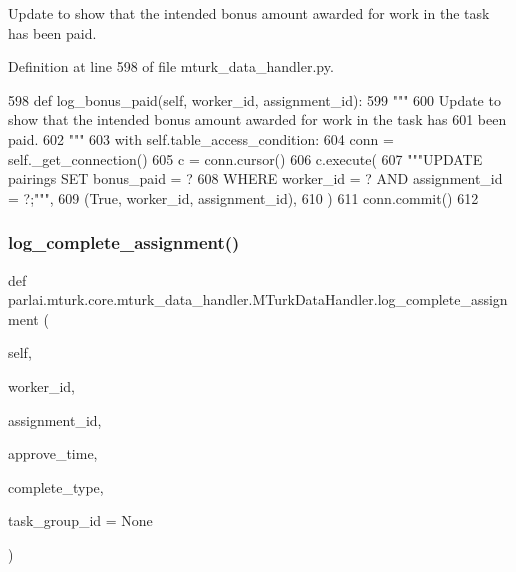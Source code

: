 \begin{DoxyVerb}Update to show that the intended bonus amount awarded for work in the task has
been paid.
\end{DoxyVerb}
 

Definition at line 598 of file mturk\+\_\+data\+\_\+handler.\+py.


\begin{DoxyCode}
598     \textcolor{keyword}{def }log\_bonus\_paid(self, worker\_id, assignment\_id):
599         \textcolor{stringliteral}{"""}
600 \textcolor{stringliteral}{        Update to show that the intended bonus amount awarded for work in the task has}
601 \textcolor{stringliteral}{        been paid.}
602 \textcolor{stringliteral}{        """}
603         with self.table\_access\_condition:
604             conn = self.\_get\_connection()
605             c = conn.cursor()
606             c.execute(
607                 \textcolor{stringliteral}{"""UPDATE pairings SET bonus\_paid = ?}
608 \textcolor{stringliteral}{                         WHERE worker\_id = ? AND assignment\_id = ?;"""},
609                 (\textcolor{keyword}{True}, worker\_id, assignment\_id),
610             )
611             conn.commit()
612 
\end{DoxyCode}
\mbox{\label{classparlai_1_1mturk_1_1core_1_1mturk__data__handler_1_1MTurkDataHandler_a78a1aacc3cce8b8afd0153ad68c09baf}} 
\subsubsection{\texorpdfstring{log\+\_\+complete\+\_\+assignment()}{log\_complete\_assignment()}}
{\footnotesize\ttfamily def parlai.\+mturk.\+core.\+mturk\+\_\+data\+\_\+handler.\+M\+Turk\+Data\+Handler.\+log\+\_\+complete\+\_\+assignment (\begin{DoxyParamCaption}\item[{}]{self,  }\item[{}]{worker\+\_\+id,  }\item[{}]{assignment\+\_\+id,  }\item[{}]{approve\+\_\+time,  }\item[{}]{complete\+\_\+type,  }\item[{}]{task\+\_\+group\+\_\+id = {\ttfamily None} }\end{DoxyParamCaption})}

